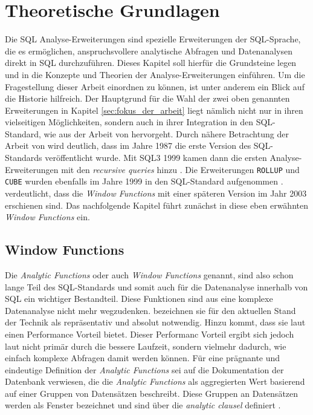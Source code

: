 \chapter{Theoretische Grundlagen}
\label{chap:hintergund_und_grundlagen} Die SQL Analyse-Erweiterungen sind spezielle
Erweiterungen der SQL-Sprache, die es ermöglichen, anspruchsvollere analytische Abfragen
und Datenanalysen direkt in SQL durchzuführen. Dieses Kapitel soll hierfür die
Grundsteine legen und in die Konzepte und Theorien der Analyse-Erweiterungen
einführen. Um die Fragestellung dieser Arbeit einordnen zu können, ist unter
anderem ein Blick auf die Historie hilfreich. Der Hauptgrund für die Wahl der zwei
oben genannten Erweiterungen in Kapitel \ref{sec:fokus_der_arbeit} liegt nämlich
nicht nur in ihren vielseitigen Möglichkeiten, sondern auch in ihrer Integration
in den SQL-Standard, wie aus der Arbeit von \citet[S.~10]{grust2017advanced}
hervorgeht. Durch nähere Betrachtung der Arbeit von \cite{grust2017advanced} wird
deutlich, dass im Jahre 1987 die erste Version des SQL-Standards veröffentlicht
wurde. Mit SQL3 1999 kamen dann die ersten Analyse-Erweiterungen mit den \textit{recursive
queries} hinzu \citep[vgl.][S.~10]{grust2017advanced}. Die Erweiterungen \texttt{ROLLUP}
und \texttt{CUBE} wurden ebenfalls im Jahre 1999 in den SQL-Standard aufgenommen
\citep[vgl.][Kapitel 9.12]{melton2001sql}. \citet[S.~10]{grust2017advanced}
verdeutlicht, dass die \textit{Window Functions} mit einer späteren Version im
Jahr 2003 erschienen sind. Das nachfolgende Kapitel führt zunächst in diese eben
erwähnten \textit{Window Functions} ein.

\section{Window Functions}
\label{sec:window_functions} Die \textit{Analytic Functions} oder auch \textit{Window
Functions} genannt, sind also schon lange Teil des SQL-Standards und somit auch für
die Datenanalyse innerhalb von SQL ein wichtiger Bestandteil. Diese Funktionen
sind aus eine komplexe Datenanalyse nicht mehr wegzudenken. \citet[S. 1244]{cao2012optimization}
bezeichnen sie für den aktuellen Stand der Technik als repräsentativ und absolut
notwendig. Hinzu kommt, dass sie laut \citet[S. 113]{kellenberger2019expert} einen
Performance Vorteil bietet. Dieser Performanc Vorteil ergibt sich jedoch laut
\citet{kellenberger2019expert} nicht primär durch die bessere Laufzeit, sondern
vielmehr dadurch, wie einfach komplexe Abfragen damit werden können. Für eine
prägnante und eindeutige Definition der \textit{Analytic Functions} sei auf die Dokumentation
der \citet{oracle} Datenbank verwiesen, die die \textit{Analytic Functions} als
aggregierten Wert basierend auf einer Gruppen von Datensätzen beschreibt. Diese Gruppen
an Datensätzen werden als Fenster bezeichnet und sind über die \textit{analytic
clausel} definiert \citep[vgl.][]{oracle}.

